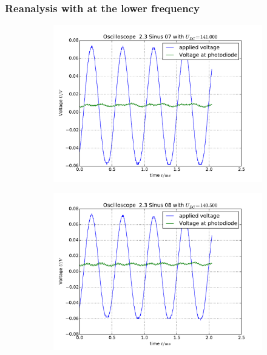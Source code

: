 \subsubsection{Reanalysis with at the lower frequency}
\begin{figure}
    \begin{subfigure}[b]{\picwidth}
        \includegraphics[width=\textwidth]{analysis/figures/23sinus07}
        \caption{}
    \end{subfigure}\qquad
    \begin{subfigure}[b]{\picwidth}
        \includegraphics[width=\textwidth]{analysis/figures/23sinus08}
        \caption{}
    \end{subfigure}
    \begin{subfigure}[b]{\picwidth}

\end{subfigure}
\end{figure}
